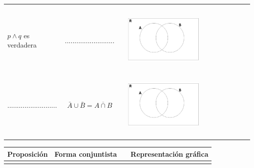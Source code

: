 \documentclass[12pt]{article}
\theoremstyle{definition}
\theoremstyle{remark}
\begin{document}
\begin{enumerate}
\begin{table}[ H]
\begin{center}
\begin{tabular} { l c c l }
\begin{minipage}{5cm}
\begin{center}
\end{center}
\end{minipage}\\ \\ 
 $p \wedge q$ es verdadera&$..........................$ & &\begin{minipage}{5cm} \begin{center} 
\includegraphics[width=0.6\textwidth]{tp3_fig6} 
\end{center}
\end{minipage}\\ \\  
$..........................$&$\bar{A}\cup \bar{B} = \overline{A\cap B}$ & & \begin{minipage}{5cm} \begin{center} 
\includegraphics[width=0.6\textwidth]{tp3_fig6} 
\end{center}
\end{minipage}\\ \\

\end{tabular} 
\end{center} 
\end{table}

\begin{table}[ H]
\begin{center} 
\begin{tabular} { l c c l }
\textbf{Proposición}&\textbf{Forma conjuntista}& & \textbf{Representación gráfica}\\ \hline  \\ 
  

\end{tabular}
\end{center}
\end{table}
\end{enumerate}
\end{document}
